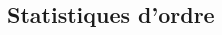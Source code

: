 \documentclass[10pt, french]{article}
\begin{document}
\begin{multicols*}{2}
%	




\columnbreak	

\subsection*{Statistiques d'ordre}


\end{multicols*}
\end{document}
